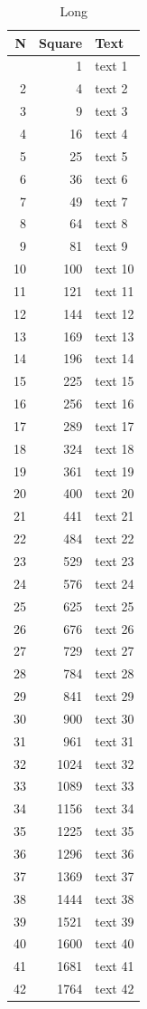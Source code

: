 \documentclass[10pt]{article}
\begin{document}
\begin{longtable}{rrl}\caption{Long}\\\toprule N&Square&Text\\\midrule\endfirsthead\midrule\endhead\bottomrule\endfoot
1&1&text 1\\
2&4&text 2\\
3&9&text 3\\
4&16&text 4\\
5&25&text 5\\
6&36&text 6\\
7&49&text 7\\
8&64&text 8\\
9&81&text 9\\
10&100&text 10\\
11&121&text 11\\
12&144&text 12\\
13&169&text 13\\
14&196&text 14\\
15&225&text 15\\
16&256&text 16\\
17&289&text 17\\
18&324&text 18\\
19&361&text 19\\
20&400&text 20\\
21&441&text 21\\
22&484&text 22\\
23&529&text 23\\
24&576&text 24\\
25&625&text 25\\
26&676&text 26\\
27&729&text 27\\
28&784&text 28\\
29&841&text 29\\
30&900&text 30\\
31&961&text 31\\
32&1024&text 32\\
33&1089&text 33\\
34&1156&text 34\\
35&1225&text 35\\
36&1296&text 36\\
37&1369&text 37\\
38&1444&text 38\\
39&1521&text 39\\
40&1600&text 40\\
41&1681&text 41\\
42&1764&text 42\\

\end{longtable}
\end{document}
